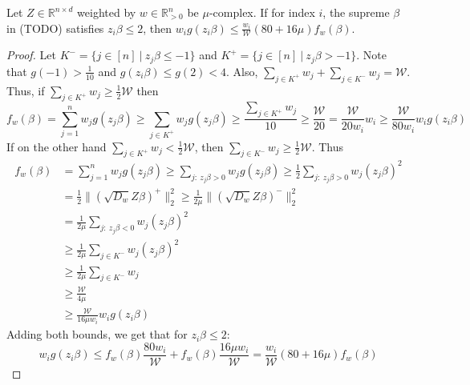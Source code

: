 \begin{lemma}
    Let $Z \in \mathbb{R}^{n \times d}$ weighted by $w \in \mathbb{R}^n_{>0}$
    be $\mu$-complex. If for index $i$, the supreme $\beta$ in (TODO) satisfies
    $z_i \beta \leq 2$, then
    $w_i g(z_i \beta) \leq \frac{w_i}{\mathcal{W}} (80 + 16 \mu) f_w(\beta)$.
\end{lemma}
\begin{proof}
    Let $K^- = \{ j \in [n] \ | \ z_j \beta \leq -1 \}$ and 
    $K^+ = \{ j \in [n] \ | \ z_j \beta > -1 \}$.
    Note that $g(-1) > \frac{1}{10}$ and
    $g(z_i \beta) \leq g(2) < 4$.
    Also, $\sum_{j \in K^+} w_j + \sum_{j \in K^-} w_j = \mathcal{W}$.
    \\
    Thus, if $\sum_{j \in K^+} w_j \geq \frac{1}{2} \mathcal{W}$ then
    $$
        f_w(\beta) = \sum_{j=1}^n w_j g(z_j \beta)
        \geq \sum_{j \in K^+} w_j g(z_j \beta)
        \geq \frac{\sum_{j \in K^+} w_j}{10}
        \geq \frac{\mathcal{W}}{20}
        = \frac{\mathcal{W}}{20 w_i} w_i
        \geq \frac{\mathcal{W}}{80 w_i} w_i g(z_i \beta)
    $$
    If on the other hand $\sum_{j \in K^+} w_j < \frac{1}{2} \mathcal{W}$, 
    then $\sum_{j \in K^-} w_j \geq \frac{1}{2} \mathcal{W}$. Thus
    \begin{align*}
        f_w(\beta) 
         & = \sum_{j=1}^n w_j g(z_j \beta)
        \geq \sum_{j: \  z_j \beta > 0} w_j g(z_j \beta)
        \geq \frac{1}{2} \sum_{j: \  z_j \beta > 0} w_j (z_j \beta)^2    \\
         & = \frac{1}{2} \lVert (\sqrt{D_w} Z \beta)^+ \rVert_2^2
        \geq \frac{1}{2 \mu} \lVert (\sqrt{D_w} Z \beta)^- \rVert_2^2    \\
         & = \frac{1}{2 \mu} \sum_{j: \ z_j \beta < 0} w_j (z_j \beta)^2 \\
         & \geq \frac{1}{2 \mu} \sum_{j \in K^-} w_j (z_j \beta)^2       \\
         & \geq \frac{1}{2 \mu} \sum_{j \in K^-} w_j                     \\
         & \geq \frac{\mathcal{W}}{4 \mu}                                \\
         & \geq \frac{\mathcal{W}}{16 \mu w_i} w_i g(z_i \beta)
    \end{align*}
    Adding both bounds, we get that for $z_i \beta \leq 2$:
    $$
        w_i g(z_i \beta) \leq f_w(\beta) \frac{80 w_i}{\mathcal{W}}
        + f_w(\beta) \frac{16 \mu w_i}{\mathcal{W}}
        = \frac{w_i}{\mathcal{W}} (80 + 16 \mu) f_w(\beta)
    $$
\end{proof}

